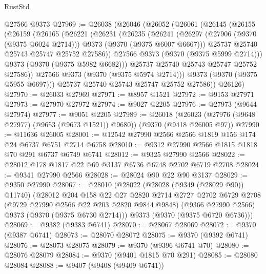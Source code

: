 \begin{lexlean}{RustStd}
\begin{coremodule}
    @27566
    @9373
@27969 := @26038
    (@26046
      (@26052
        (@26061
          (@26145
            (@26155
              (@26159
                (@26165
                  (@26221
                    (@26231
                      (@26235
                        (@26241
                          (@26297
                            (@27906 (@9370 (@9375 @6024 @2714)))
                            @9373
                            (@9370 (@9375 @6007 @6667)))
                          @25737
                          @25740
                          @25743
                          @25747
                          @25752
                          @27586))
                      @27566
                      @9373
                      (@9370 (@9375 @5999 @2714)))
                    @9373
                    (@9370 (@9375 @5982 @6682)))
                  @25737
                  @25740
                  @25743
                  @25747
                  @25752
                  @27586))
              @27566
              @9373
              (@9370 (@9375 @5974 @2714)))
            @9373
            (@9370 (@9375 @5955 @6697)))
          @25737
          @25740
          @25743
          @25747
          @25752
          @27586))
      @26126)
@27970 := @26033 @27969
@27971 := @8957 @1521
@27972 := @9153 @27971
@27973 := @27970 @27972
@27974 := @9027 @2205
@27976 := @27973 (@9644 @27974)
@27977 := @9051 @2205
@27989 := @26018
    (@26023 (@27976 (@9648 @27977) (@9653 (@9673 @1521)) @9680))
    (@9370 (@9418 @26005 @97))
@27990 := @11636 @26005
@28001 := @12542 @27990 @2566 @2566 @1819 @156 @174 @24 @6737 @6751 @2714 @6758
@28010 := @9312 @27990 @2566 @1815 @1818 @70 @291 @6737 @6749 @6741
@28012 := @9325 @27990 @2566
@28022 := @28012 @178 @1817 @22 @69 @3137 @6736 @6748 @2702 @6719 @2708
@28024 := @9341 @27990 @2566
@28028 := @28024 @90 @22 @90 @3137
@28029 := @9350 @27990
@28067 := @28010
    (@28022
      (@28028 (@9349 (@28029 @90)) @11740)
      (@28012
        @204
        @158
        @22
        @27
        @2820
        @2714
        @2727
        @2702
        @6729
        @2708
        (@9729 @27990 @2566 @22 @203 @2820 @9844 @9848)
        (@9366 @27990 @2566)
        @9373
        (@9370 (@9375 @6730 @2714)))
      @9373
      (@9370 (@9375 @6720 @6736)))
@28069 := @9382 (@9383 @6741)
@28070 := @28067 @28069
@28072 := @9370 (@9387 @6741)
@28073 := @28070 @28072
@28075 := @9370 (@9392 @6741)
@28076 := @28073 @28075
@28079 := @9370 (@9396 @6741 @70)
@28080 := @28076 @28079
@28084 := @9370 (@9401 @1815 @70 @291)
@28085 := @28080 @28084
@28088 := @9407 (@9408 (@9409 @6741))

\end{coremodule}
\end{lexlean}
